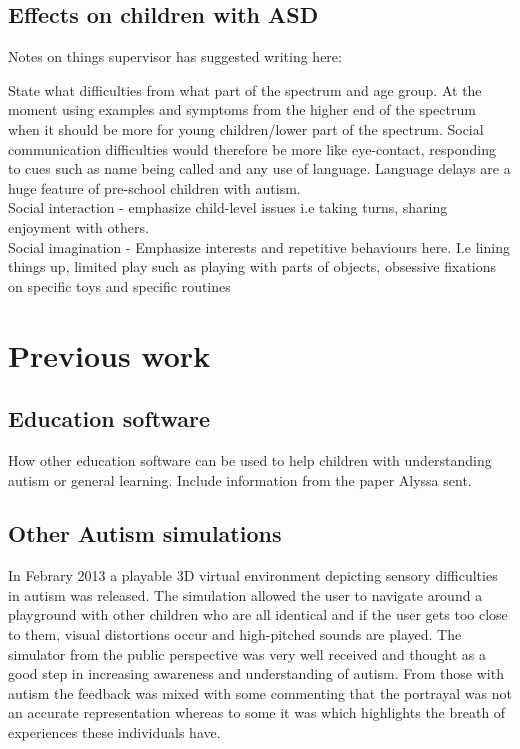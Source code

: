 \documentclass[11pt]{report}
\begin{document}
\subsection{Effects on children with ASD}

Notes on things supervisor has suggested writing here:

State what difficulties from what part of the spectrum and age group. At the moment using examples and symptoms from the higher end of the spectrum when it should be more for young children/lower part of the spectrum. Social communication difficulties would therefore be more like eye-contact, responding to cues such as name being called and any use of language. Language delays are a huge feature of pre-school children with autism.\\
Social interaction - emphasize child-level issues i.e taking turns, sharing enjoyment with others.\\
Social imagination - Emphasize interests and repetitive behaviours here. I.e lining things up, limited play such as playing with parts of objects, obsessive fixations on specific toys and specific routines\\


\section{Previous work}

\subsection{Education software}
How other education software can be used to help children with understanding autism or general learning. Include information from the paper Alyssa sent.

\subsection{Other Autism simulations}

In Febrary 2013 a playable 3D virtual environment depicting sensory difficulties in autism was released. The simulation allowed the user to navigate around a playground with other children who are all identical and if the user gets too close to them, visual distortions occur and high-pitched sounds are played. The simulator from the public perspective was very well received and thought as a good step in increasing awareness and understanding of autism. From those with autism the feedback was mixed with some commenting that the portrayal was not an accurate representation whereas to some it was which highlights the breath of experiences these individuals have.
\end{document}
